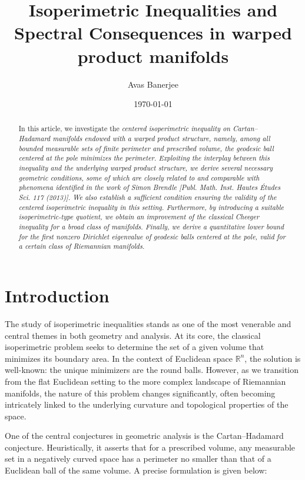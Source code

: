 \documentclass[a4paper,11pt,reqno]{amsart}
\title[Isoperimetric inequlities and spectral consequences]{Isoperimetric Inequalities and Spectral Consequences in warped product manifolds}
\author[A. Banerjee]{Avas Banerjee}
\date{\today}
\theoremstyle{plain}
\numberwithin{equation}{section} \allowdisplaybreaks
\begin{document}
\begin{abstract}
 
In this article, we investigate the \it centered isoperimetric inequality \rm on Cartan–Hadamard manifolds endowed with a warped product structure, namely, among all bounded measurable sets of finite perimeter and prescribed volume, the geodesic ball centered at the pole minimizes the perimeter. Exploiting the interplay between this inequality and the underlying warped product structure, we derive several necessary geometric conditions, some of which are closely related to and comparable with phenomena identified in the work of Simon Brendle [Publ. Math. Inst. Hautes Études Sci. 117  (2013)]. We also establish a sufficient condition ensuring the validity of the centered isoperimetric inequality in this setting. Furthermore, by introducing a suitable isoperimetric-type quotient, we obtain an improvement of the classical \it Cheeger inequality \rm for a broad class of manifolds. Finally, we derive a quantitative lower bound for the first nonzero Dirichlet eigenvalue of geodesic balls centered at the pole, valid for a certain class of Riemannian manifolds.   
 \end{abstract}
 
 
\maketitle


\section{Introduction}

The study of isoperimetric inequalities stands as one of the most venerable and central themes in both geometry and analysis. At its core, the classical isoperimetric problem seeks to determine the set of a given volume that minimizes its boundary area. In the context of Euclidean space $\mathbb{R}^n$, the solution is well-known: the unique minimizers are the round balls. However, as we transition from the flat Euclidean setting to the more complex landscape of Riemannian manifolds, the nature of this problem changes significantly, often becoming intricately linked to the underlying curvature and topological properties of the space.

One of the central conjectures in geometric analysis is the Cartan--Hadamard conjecture. Heuristically, it asserts that for a prescribed volume, any measurable set in a negatively curved space has a perimeter no smaller than that of a Euclidean ball of the same volume. A precise formulation is given below: 
\end{document}
